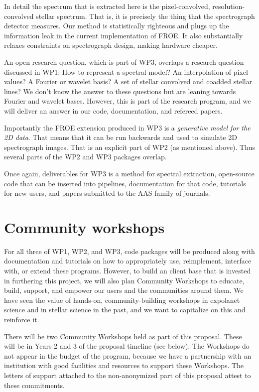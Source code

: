 \documentclass[12pt]{article}
\begin{document}
In detail the spectrum that is extracted here is the pixel-convolved, resolution-convolved stellar spectrum. That is, it is precisely the thing that the spectrograph detector measures.
Our method is statistically righteous and plugs up the information leak in the current implementation of FROE.
It also substantially relaxes constraints on spectrograph design, making hardware cheaper.

An open research question, which is part of WP3, overlaps a research question discussed in WP1: How to represent a spectral model? An interpolation of pixel values? A Fourier or wavelet basis? A set of stellar convolved and coadded stellar lines? We don't know the answer to these questions but are leaning towards Fourier and wavelet bases. However, this is part of the research program, and we will deliver an answer in our code, documentation, and refereed papers.

Importantly the FROE extension produced in WP3 is a \emph{generative model for the 2D data}.
That means that it can be run backwards and used to simulate 2D spectrograph images.
That is an explicit part of WP2 (as mentioned above).
Thus several parts of the WP2 and WP3 packages overlap.

Once again, deliverables for WP3 is a method for spectral extraction, open-source code that can be inserted into pipelines, documentation for that code, tutorials for new users, and papers submitted to the AAS family of journals.

\section{Community workshops}

For all three of WP1, WP2, and WP3, code packages will be produced along with documentation and tutorials on how to appropriately use, reimplement, interface with, or extend these programs. However, to build an client base that is invested in furthering this project, we will also plan Community Workshops to educate, build, support, and empower our users and the communities around them. We have seen the value of hands-on, community-building workshops in expolanet science and in stellar science in the past, and we want to capitalize on this and reinforce it.

There will be two Community Workshops held as part of this proposal. These will be in Years 2 and 3 of the proposal timeline (see below).
The Workshops do not appear in the budget of the program, because we have a partnership with an institution with good facilities and resources to support these Workshops.
The letters of support attached to the non-anonymized part of this proposal attest to these commitments.
\end{document}

